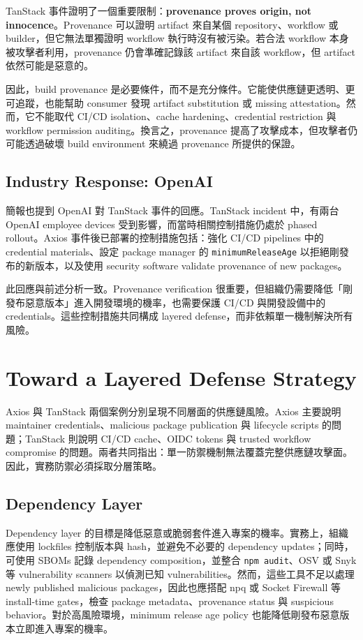 \documentclass[12pt,a4paper]{article}
\begin{document}
TanStack 事件證明了一個重要限制：\textbf{provenance proves origin, not innocence}。Provenance 可以證明 artifact 來自某個 repository、workflow 或 builder，但它無法單獨證明 workflow 執行時沒有被污染。若合法 workflow 本身被攻擊者利用，provenance 仍會準確記錄該 artifact 來自該 workflow，但 artifact 依然可能是惡意的。

因此，build provenance 是必要條件，而不是充分條件。它能使供應鏈更透明、更可追蹤，也能幫助 consumer 發現 artifact substitution 或 missing attestation。然而，它不能取代 CI/CD isolation、cache hardening、credential restriction 與 workflow permission auditing。換言之，provenance 提高了攻擊成本，但攻擊者仍可能透過破壞 build environment 來繞過 provenance 所提供的保證。

\subsection{Industry Response: OpenAI}

簡報也提到 OpenAI 對 TanStack 事件的回應。TanStack incident 中，有兩台 OpenAI employee devices 受到影響，而當時相關控制措施仍處於 phased rollout。Axios 事件後已部署的控制措施包括：強化 CI/CD pipelines 中的 credential materials、設定 package manager 的 \texttt{minimumReleaseAge} 以拒絕剛發布的新版本，以及使用 security software validate provenance of new packages。

此回應與前述分析一致。Provenance verification 很重要，但組織仍需要降低「剛發布惡意版本」進入開發環境的機率，也需要保護 CI/CD 與開發設備中的 credentials。這些控制措施共同構成 layered defense，而非依賴單一機制解決所有風險。

\section{Toward a Layered Defense Strategy}

Axios 與 TanStack 兩個案例分別呈現不同層面的供應鏈風險。Axios 主要說明 maintainer credentials、malicious package publication 與 lifecycle scripts 的問題；TanStack 則說明 CI/CD cache、OIDC tokens 與 trusted workflow compromise 的問題。兩者共同指出：單一防禦機制無法覆蓋完整供應鏈攻擊面。因此，實務防禦必須採取分層策略。

\subsection{Dependency Layer}

Dependency layer 的目標是降低惡意或脆弱套件進入專案的機率。實務上，組織應使用 lockfiles 控制版本與 hash，並避免不必要的 dependency updates；同時，可使用 SBOMs 記錄 dependency composition，並整合 \texttt{npm audit}、OSV 或 Snyk 等 vulnerability scanners 以偵測已知 vulnerabilities。然而，這些工具不足以處理 newly published malicious packages，因此也應搭配 npq 或 Socket Firewall 等 install-time gates，檢查 package metadata、provenance status 與 suspicious behavior。對於高風險環境，minimum release age policy 也能降低剛發布惡意版本立即進入專案的機率。
\end{document}
